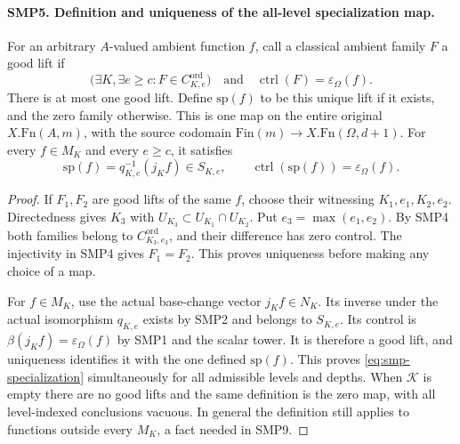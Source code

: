 \paragraph{SMP5. Definition and uniqueness of the all-level specialization map.}
\label{claim:SMP5}
For an arbitrary $A$-valued ambient function $f$, call
a classical ambient family $F$ a good lift if
\begin{equation}\label{eq:smp-good}
 \bigl(\exists K,\exists e\geq c:
                   F\in C^{\mathrm{ord}}_{K,e}\bigr)
       \quad\text{and}\quad
             \operatorname{ctrl}(F)=\varepsilon_\Omega(f).
\end{equation}
There is at most one good lift.  Define $\mathrm{sp}(f)$
to be this unique lift if it exists, and the zero family
otherwise.  This is one map on the entire original
$X.\mathrm{Fn}(A,m)$, with the source codomain
$\mathrm{Fin}(m)\to X.\mathrm{Fn}(\Omega,d+1)$.
For every $f\in M_K$ and every $e\geq c$, it satisfies
\begin{equation}\label{eq:smp-specialization}
 \mathrm{sp}(f)=q_{K,e}^{-1}(j_K f)\in S_{K,e},\qquad
       \operatorname{ctrl}(\mathrm{sp}(f))=
                                        \varepsilon_\Omega(f).
\end{equation}
\begin{proof}
If $F_1,F_2$ are good lifts of the same $f$, choose
their witnessing $K_1,e_1,K_2,e_2$.  Directedness gives
$K_3$ with $U_{K_3}\subset U_{K_1}\cap U_{K_2}$.
Put $e_3=\max(e_1,e_2)$.  By SMP4 both families belong
to $C^{\mathrm{ord}}_{K_3,e_3}$, and their difference
has zero control.  The injectivity in SMP4 gives
$F_1=F_2$.  This proves uniqueness before making any
choice of a map.

For $f\in M_K$, use the actual base-change vector
$j_K f\in N_K$.  Its inverse under the actual isomorphism
$q_{K,e}$ exists by SMP2 and belongs to $S_{K,e}$.
Its control is $\beta(j_K f)=\varepsilon_\Omega(f)$
by SMP1 and the scalar tower.  It is therefore a good
lift, and uniqueness identifies it with the one
defined $\mathrm{sp}(f)$.  This proves
\eqref{eq:smp-specialization} simultaneously for all
admissible levels and depths.  When $\mathcal K$ is
empty there are no good lifts and the same definition
is the zero map, with all level-indexed conclusions
vacuous.  In general the definition still applies to
functions outside every $M_K$, a fact needed in SMP9.
\end{proof}

